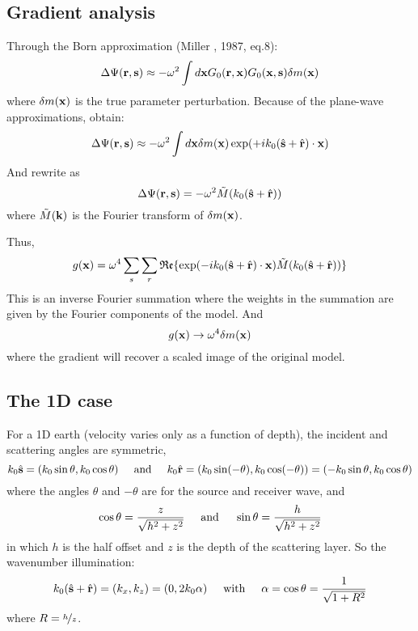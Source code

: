 \subsection{Gradient analysis}
Through the Born approximation (Miller \etal, 1987, eq.8):
\[ \Delta\Psi(\mathbf{r},\mathbf{s})\approx-\omega^2\int d\mathbf{x}G_0(\mathbf{r},\mathbf{x})G_0(\mathbf{x},\mathbf{s})\delta m(\mathbf{x}) \]
where $\delta m(\mathbf{x})$ is the true parameter perturbation. Because of the plane-wave approximations, obtain:
\[ \Delta\Psi(\mathbf{r},\mathbf{s})\approx-\omega^2\int d\mathbf{x}\delta m(\mathbf{x})\exp(+ik_0(\hat{\mathbf{s}}+\hat{\mathbf{r}})\cdot\mathbf{x}) \]
And rewrite as
\[ \Delta\Psi(\mathbf{r},\mathbf{s})=-\omega^2\tilde{M}(k_0(\hat{\mathbf{s}}+\hat{\mathbf{r}})) \]
where $\tilde{M}(\mathbf{k})$ is the Fourier transform of $\delta m(\mathbf{x})$.\par
Thus,
\[ g(\mathbf{x})=\omega^4\sum_s\sum_r\mathfrak{Re}\{\exp(-ik_0(\hat{\mathbf{s}}+\hat{\mathbf{r}})\cdot\mathbf{x})\tilde{M}(k_0(\hat{\mathbf{s}}+\hat{\mathbf{r}}))\} \]
This is an inverse Fourier summation where the weights in the summation are given by the Fourier components of the model. And
\[ g(\mathbf{x})\rightarrow\omega^4\delta m(\mathbf{x}) \]
where the gradient will recover a scaled image of the original model.\par
\subsection{The 1D case}
For a 1D earth (velocity varies only as a function of depth), the incident and scattering angles are symmetric,
\[ k_0\hat{\mathbf{s}}=(k_0\sin\theta,k_0\cos\theta) \text{\hspace{5mm}and\hspace{5mm}} k_0\hat{\mathbf{r}}=(k_0\sin(-\theta),k_0\cos(-\theta))=(-k_0\sin\theta,k_0\cos\theta) \]
where the angles $\theta$ and $-\theta$ are for the source and receiver wave, and
\[ \cos\theta=\frac{z}{\sqrt{h^2+z^2}} \text{\hspace{5mm}and\hspace{5mm}} \sin\theta=\frac{h}{\sqrt{h^2+z^2}} \]
in which $h$ is the half offset and $z$ is the depth of the scattering layer. So the wavenumber illumination:
\[ k_0(\hat{\mathbf{s}}+\hat{\mathbf{r}})=(k_x,k_z)=(0,2k_0\alpha) \text{\hspace{5mm}with\hspace{5mm}} \alpha=\cos\theta=\frac{1}{\sqrt{1+R^2}} \]
where $R=\nicefrac{h}{z}$.\par
